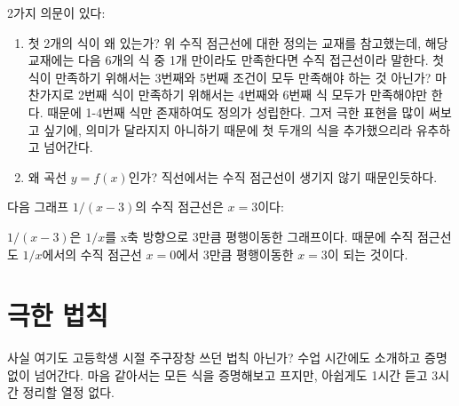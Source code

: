 \documentclass[../note.tex]{subfiles}
\begin{document}
\begin{note}
  2가지 의문이 있다:
  \begin{enumerate}
    \item
      첫 2개의 식이 왜 있는가? 위 수직 점근선에 대한 정의는 교재를 참고했는데, 해당 교재에는 다음 6개의 식 중 1개 만이라도 만족한다면 수직 접근선이라 말한다. 첫 식이 만족하기 위해서는 3번째와 5번째 조건이 모두 만족해야 하는 것 아닌가? 마찬가지로 2번째 식이 만족하기 위해서는 4번째와 6번째 식 모두가 만족해야만 한다. 때문에 1-4번째 식만 존재하여도 정의가 성립한다. 그저 극한 표현을 많이 써보고 싶기에, 의미가 달라지지 아니하기 때문에 첫 두개의 식을 추가했으리라 유추하고 넘어간다.
    \item
      왜 곡선 $y=f(x)$인가? 직선에서는 수직 점근선이 생기지 않기 때문인듯하다.
  \end{enumerate}
\end{note}

\begin{example}
  다음 그래프 $1/(x-3)$의 수직 점근선은 $x=3$이다:
  \begin{center}
  \end{center}
  $1/(x-3)$은 $1/x$를 x축 방향으로 3만큼 평행이동한 그래프이다. 때문에 수직 점근선도 $1/x$에서의 수직 점근선 $x=0$에서 3만큼 평행이동한 $x=3$이 되는 것이다.
\end{example}

\section{극한 법칙}
사실 여기도 고등학생 시절 주구장창 쓰던 법칙 아닌가? 수업 시간에도 소개하고 증명 없이 넘어간다. 마음 같아서는 모든 식을 증명해보고 프지만, 아쉽게도 1시간 듣고 3시간 정리할 열정 없다.
\end{document}
